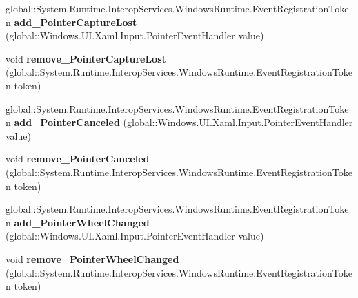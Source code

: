 \begin{DoxyCompactItemize}
\mbox{\label{interface_windows_1_1_u_i_1_1_xaml_1_1_i_u_i_element_a4600eed2eadce86aaa8771cc8aedbb0d}} 
global\+::\+System.\+Runtime.\+Interop\+Services.\+Windows\+Runtime.\+Event\+Registration\+Token {\bfseries add\+\_\+\+Pointer\+Capture\+Lost} (global\+::\+Windows.\+U\+I.\+Xaml.\+Input.\+Pointer\+Event\+Handler value)
\item 
\mbox{\label{interface_windows_1_1_u_i_1_1_xaml_1_1_i_u_i_element_a0e8fccaf0e69daa6bc50f43458fa846a}} 
void {\bfseries remove\+\_\+\+Pointer\+Capture\+Lost} (global\+::\+System.\+Runtime.\+Interop\+Services.\+Windows\+Runtime.\+Event\+Registration\+Token token)
\item 
\mbox{\label{interface_windows_1_1_u_i_1_1_xaml_1_1_i_u_i_element_aece41d38eee31db31fcc9ce4940bc61d}} 
global\+::\+System.\+Runtime.\+Interop\+Services.\+Windows\+Runtime.\+Event\+Registration\+Token {\bfseries add\+\_\+\+Pointer\+Canceled} (global\+::\+Windows.\+U\+I.\+Xaml.\+Input.\+Pointer\+Event\+Handler value)
\item 
\mbox{\label{interface_windows_1_1_u_i_1_1_xaml_1_1_i_u_i_element_ac9b592ea4f90c7a92f1def7811d1d96f}} 
void {\bfseries remove\+\_\+\+Pointer\+Canceled} (global\+::\+System.\+Runtime.\+Interop\+Services.\+Windows\+Runtime.\+Event\+Registration\+Token token)
\item 
\mbox{\label{interface_windows_1_1_u_i_1_1_xaml_1_1_i_u_i_element_a2716b15da4333bb063c9bc09c373340f}} 
global\+::\+System.\+Runtime.\+Interop\+Services.\+Windows\+Runtime.\+Event\+Registration\+Token {\bfseries add\+\_\+\+Pointer\+Wheel\+Changed} (global\+::\+Windows.\+U\+I.\+Xaml.\+Input.\+Pointer\+Event\+Handler value)
\item 
\mbox{\label{interface_windows_1_1_u_i_1_1_xaml_1_1_i_u_i_element_abfc60dbc7d299bf2692903f393ed810f}} 
void {\bfseries remove\+\_\+\+Pointer\+Wheel\+Changed} (global\+::\+System.\+Runtime.\+Interop\+Services.\+Windows\+Runtime.\+Event\+Registration\+Token token)
\item 

\end{DoxyCompactItemize}

